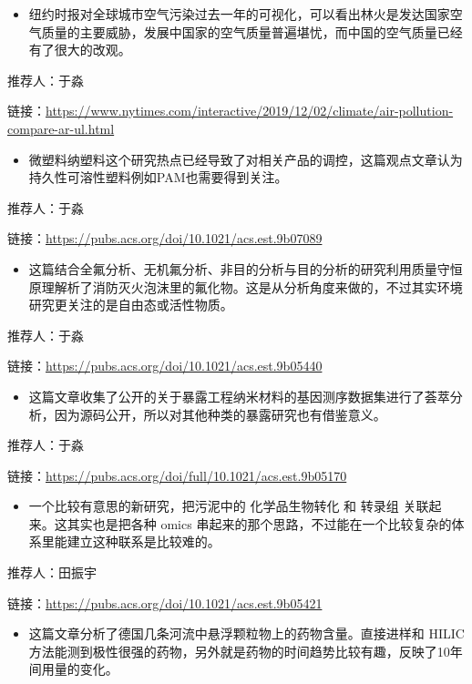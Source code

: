 \documentclass[]{book}
\providecommand{\tightlist}{%
  \setlength{\itemsep}{0pt}\setlength{\parskip}{0pt}}
\begin{document}
\begin{itemize}
\tightlist
\item
  纽约时报对全球城市空气污染过去一年的可视化，可以看出林火是发达国家空气质量的主要威胁，发展中国家的空气质量普遍堪忧，而中国的空气质量已经有了很大的改观。
\end{itemize}

推荐人：于淼

链接：\url{https://www.nytimes.com/interactive/2019/12/02/climate/air-pollution-compare-ar-ul.html}

\begin{itemize}
\tightlist
\item
  微塑料纳塑料这个研究热点已经导致了对相关产品的调控，这篇观点文章认为持久性可溶性塑料例如PAM也需要得到关注。
\end{itemize}

推荐人：于淼

链接：\url{https://pubs.acs.org/doi/10.1021/acs.est.9b07089}

\begin{itemize}
\tightlist
\item
  这篇结合全氟分析、无机氟分析、非目的分析与目的分析的研究利用质量守恒原理解析了消防灭火泡沫里的氟化物。这是从分析角度来做的，不过其实环境研究更关注的是自由态或活性物质。
\end{itemize}

推荐人：于淼

链接：\url{https://pubs.acs.org/doi/10.1021/acs.est.9b05440}

\begin{itemize}
\tightlist
\item
  这篇文章收集了公开的关于暴露工程纳米材料的基因测序数据集进行了荟萃分析，因为源码公开，所以对其他种类的暴露研究也有借鉴意义。
\end{itemize}

推荐人：于淼

链接：\url{https://pubs.acs.org/doi/full/10.1021/acs.est.9b05170}

\begin{itemize}
\tightlist
\item
  一个比较有意思的新研究，把污泥中的 化学品生物转化 和 转录组 关联起来。这其实也是把各种 omics 串起来的那个思路，不过能在一个比较复杂的体系里能建立这种联系是比较难的。
\end{itemize}

推荐人：田振宇

链接：\url{https://pubs.acs.org/doi/10.1021/acs.est.9b05421}

\begin{itemize}
\tightlist
\item
  这篇文章分析了德国几条河流中悬浮颗粒物上的药物含量。直接进样和 HILIC 方法能测到极性很强的药物，另外就是药物的时间趋势比较有趣，反映了10年间用量的变化。
\end{itemize}
\end{document}
